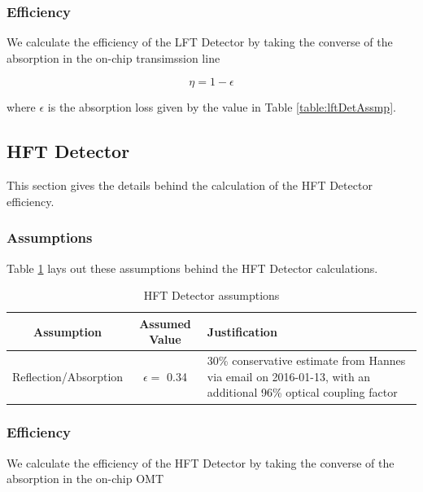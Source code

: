 \documentclass[12pt, titlepage]{article} %
\begin{document}

\subsubsection{Efficiency}

We calculate the efficiency of the LFT Detector by taking the converse of the absorption in the on-chip transimssion line

\begin{equation}
	\eta = 1 - \epsilon
\end{equation}

where $\epsilon$ is the absorption loss given by the value in Table \ref{table:lftDetAssmp}.


\subsection{HFT Detector}

This section gives the details behind the calculation of the HFT Detector efficiency.


\subsubsection{Assumptions}

 Table \ref{table:hftDetAssmp} lays out these assumptions behind the HFT Detector calculations.

\begin{table}[H]
	\centering
	\begin{tabularx}{\textwidth}{|| c | c | X ||}
	\hline
	Assumption & Assumed Value & Justification \\
	\hline
	\hline
	Reflection/Absorption & $\epsilon =$ 0.34 & 30\% conservative estimate from Hannes via email on 2016-01-13, with an additional 96\% optical coupling factor \\
	\hline
	\end{tabularx}
\caption{HFT Detector assumptions \label{table:hftDetAssmp}}
\end{table}


\subsubsection{Efficiency}

We calculate the efficiency of the HFT Detector by taking the converse of the absorption in the on-chip OMT
\end{document}
